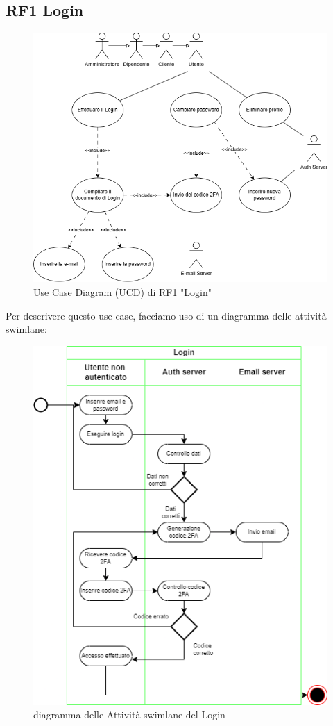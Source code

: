 \documentclass{report}
\begin{document}
\subsection*{RF1 Login }
\begin{figure}[H]
	\centering\includegraphics[width=1\textwidth]{images/UCD/RF1_login_UCD.png}
	Use Case Diagram (UCD) di RF1 "Login"
\end{figure}
Per descrivere questo use case, facciamo uso di un diagramma delle attività swimlane:
\begin{figure}[H]
	\centering\includegraphics[width=1\textwidth]{images/Login_Swimlane.drawio.png}
	diagramma delle Attività swimlane del Login
\end{figure}
\end{document}
